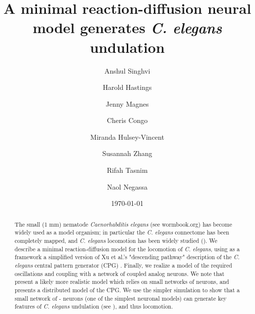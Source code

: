 \documentclass[
    11pt,
]{article}
\begin{document}


\title{A minimal reaction-diffusion neural model generates {\emph{C. elegans}} undulation}

\author[1]{Anshul Singhvi}

\author[1,3]{Harold Hastings}

\author[2]{Jenny Magnes}

\author[2]{Cheris Congo}

\author[2]{Miranda Hulsey-Vincent}

\author[2]{Susannah Zhang}

\author[1]{Rifah Tasnim}

\author[1]{Naol Negassa}


\date{\today}

\begin{abstract}

    The small (1 mm) nematode \emph{Caenorhabditis elegans} (see wormbook.org) has become widely used as a model organism; in particular the \emph{C. elegans} connectome has been completely mapped, and \emph{C. elegans} locomotion has been widely studied (\citet{corsi2015}). We describe a minimal reaction-diffusion model for the locomotion of \emph{C. elegans}, using as a framework a simplified version of Xu et al.'s "descending pathway" description of the \emph{C. elegans} central pattern generator (CPG) \citet{xu2018,wen2012}.  Finally, we realize a model of the required oscillations and coupling with a network of coupled \citet{keener1983} analog neurons.
    We note that \citet{olivares2019} present a likely more realistic model which relies on small networks of neurons, and presents a distributed model of the CPG. We use the simpler simulation to show that a small network of \citet{fitzhugh1955}-\citet{nagumo1962} neurons (one of the simplest neuronal models) can generate key features of \emph{C. elegans} undulation (see \citet{magnes2012}), and thus locomotion.
\end{abstract}

\maketitle
\end{document}
